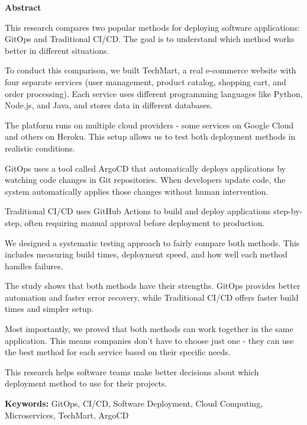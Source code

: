 \thispagestyle{empty}

\begin{center}
{\Large \textbf{Abstract}}
\end{center}

\vspace{1cm}

This research compares two popular methods for deploying software applications: GitOps and Traditional CI/CD. The goal is to understand which method works better in different situations.

To conduct this comparison, we built TechMart, a real e-commerce website with four separate services (user management, product catalog, shopping cart, and order processing). Each service uses different programming languages like Python, Node.js, and Java, and stores data in different databases.

The platform runs on multiple cloud providers - some services on Google Cloud and others on Heroku. This setup allows us to test both deployment methods in realistic conditions.

GitOps uses a tool called ArgoCD that automatically deploys applications by watching code changes in Git repositories. When developers update code, the system automatically applies those changes without human intervention.

Traditional CI/CD uses GitHub Actions to build and deploy applications step-by-step, often requiring manual approval before deployment to production.

We designed a systematic testing approach to fairly compare both methods. This includes measuring build times, deployment speed, and how well each method handles failures.

The study shows that both methods have their strengths. GitOps provides better automation and faster error recovery, while Traditional CI/CD offers faster build times and simpler setup.

Most importantly, we proved that both methods can work together in the same application. This means companies don't have to choose just one - they can use the best method for each service based on their specific needs.

This research helps software teams make better decisions about which deployment method to use for their projects.

\textbf{Keywords:} GitOps, CI/CD, Software Deployment, Cloud Computing, Microservices, TechMart, ArgoCD

\newpage